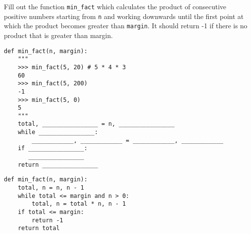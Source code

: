 \question Fill out the function \lstinline{min_fact} which calculates the product of consecutive positive numbers starting from \lstinline{n} and working downwards until the first point at which the product becomes greater than \lstinline{margin}. It should return -1 if there is no product that is greater than margin.

\begin{blocksection}
\begin{lstlisting}
def min_fact(n, margin):
    """
    >>> min_fact(5, 20) # 5 * 4 * 3
    60
    >>> min_fact(5, 200)
    -1
    >>> min_fact(5, 0)
    5
    """
    total, ________________ = n, ________________
    while ________________:
        ____________, ____________ = ____________, ____________
    if ________________:
       ________________
    return ________________

\end{lstlisting}
\end{blocksection}

\begin{blocksection}
\begin{solution}
\begin{lstlisting}
def min_fact(n, margin):
    total, n = n, n - 1
    while total <= margin and n > 0:
        total, n = total * n, n - 1
    if total <= margin:
        return -1
    return total
\end{lstlisting}
\end{solution}
\end{blocksection}